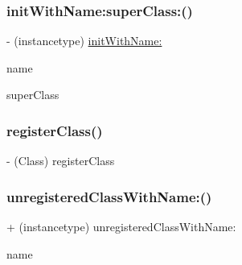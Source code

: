 \subsubsection{\texorpdfstring{init\+With\+Name\+:super\+Class\+:()}{initWithName:superClass:()}\hspace{0.1cm}{\footnotesize\ttfamily [2/2]}}
{\footnotesize\ttfamily -\/ (instancetype) \hyperlink{interface_m_a_r_unregistered_class_a30a663a7d2fe88bd68a3480a586985e2}{init\+With\+Name\+:} \begin{DoxyParamCaption}\item[{(N\+S\+String $\ast$)}]{name }\item[{superClass:(Class)}]{super\+Class }\end{DoxyParamCaption}\hspace{0.3cm}{\ttfamily [implementation]}}

\mbox{\label{interface_m_a_r_unregistered_class_aa7a1d3613bbd77fc0e08de84385e569e}} 
\subsubsection{\texorpdfstring{register\+Class()}{registerClass()}}
{\footnotesize\ttfamily -\/ (Class) register\+Class \begin{DoxyParamCaption}{ }\end{DoxyParamCaption}}

\mbox{\label{interface_m_a_r_unregistered_class_aeac9876ee6f665656a32c8aec95690ed}} 
\subsubsection{\texorpdfstring{unregistered\+Class\+With\+Name\+:()}{unregisteredClassWithName:()}}
{\footnotesize\ttfamily + (instancetype) unregistered\+Class\+With\+Name\+: \begin{DoxyParamCaption}\item[{(N\+S\+String $\ast$)}]{name }\end{DoxyParamCaption}}

